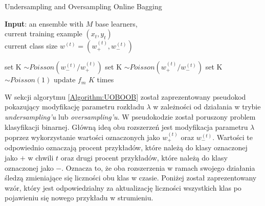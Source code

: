 \begin{algorithm}
    \caption{Undersampling and Oversampling Online Bagging \cite{Article:OBSecond}}\label{Algorithm:UOBOOB}
    \textbf{Input}: an ensemble with $M$ base learners, \\
    \hspace*{12mm} current training example $(x_t, y_t)$ \\
    \hspace*{12mm} current class size $w^{(t)} = (w^{(t)}_{+}, w^{(t)}_{-})$ \\
    \begin{algorithmic}[1]
    \vspace{0.4em}
    \vspace{0.4em}
    \State set K $\sim Poisson(w^{(t)}_{-}/w^{(t)}_{+})$
    \vspace{0.4em}
        \vspace{0.4em}
    \State set K $\sim Poisson(w^{(t)}_{+}/w^{(t)}_{-})$
    \Else
    \State set K $\sim Poisson(1)$
    \EndIf
    \State update $f_m$ $K$ times
    \EndFor
    \end{algorithmic}
\end{algorithm}

\noindent W sekcji algorytmu \ref{Algorithm:UOBOOB} został zaprezentowany pseudokod pokazujący modyfikację parametru rozkładu $\lambda$ w zależności od działania w trybie \textit{undersampling'u} lub \textit{oversampling'u}. W pseudokodzie został poruszony problem klasyfikacji binarnej. Główną ideą obu rozszerzeń jest modyfikacja parametru $\lambda$ poprzez wykorzystanie wartości oznaczonych jako $w^{(t)}_{+}$ oraz $w^{(t)}_{-}$. Wartości te odpowiednio oznaczają procent przykładów, które należą do klasy oznaczonej jako $+$ w chwili $t$ oraz drugi procent przykładów, które należą do klasy oznaczonej jako $-$. Oznacza to, że oba rozszerzenia w ramach swojego działania śledzą zmieniające się liczności obu klas w czasie. Poniżej został zaprezentowany wzór, który jest odpowiedzialny za aktualizację liczności wszystkich klas po pojawieniu się nowego przykładu w strumieniu.

